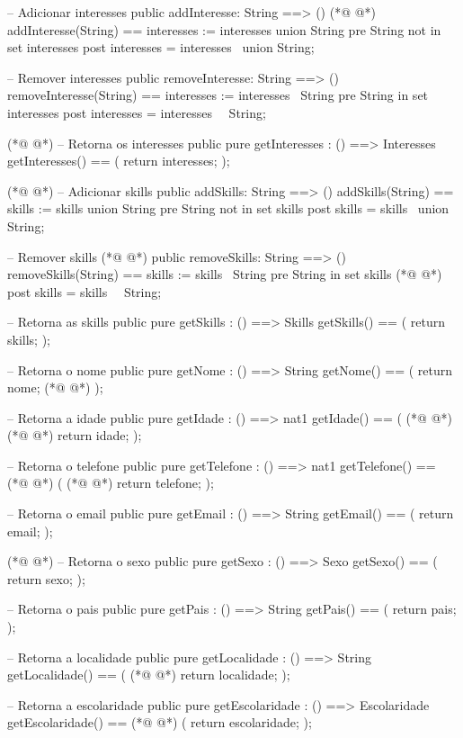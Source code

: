 \begin{vdmpp}[breaklines=true]
 -- Adicionar interesses
 public addInteresse: String ==> ()
(*@
\label{getNome:76}
@*)
 addInteresse(String) == interesses := interesses union {String}
 pre String not in set interesses
 post interesses = interesses~ union {String};
 
 -- Remover interesses
 public removeInteresse: String ==> ()
 removeInteresse(String) == interesses := interesses \ {String}
 pre String in set interesses
 post interesses = interesses~ \ {String};
 
(*@
\label{getIdade:86}
@*)
 -- Retorna os interesses
 public pure getInteresses : () ==> Interesses
 getInteresses() ==
 (
  return interesses;
 );
 
(*@
\label{getTelefone:93}
@*)
 -- Adicionar skills
 public addSkills: String ==> ()
 addSkills(String) == skills := skills union {String}
 pre String not in set skills
 post skills = skills~ union {String};
 
 -- Remover skills
(*@
\label{getSexo:100}
@*)
 public removeSkills: String ==> ()
 removeSkills(String) == skills := skills \ {String}
 pre String in set skills
(*@
\label{getEmail:103}
@*)
 post skills = skills~ \ {String};
 
 -- Retorna as skills
 public pure getSkills : () ==> Skills
 getSkills() ==
 (
  return skills;
 );
 
 -- Retorna o nome
 public pure getNome : () ==> String
 getNome() ==
 (
  return nome;
(*@
\label{setNome:117}
@*)
 );
 
 -- Retorna a idade
 public pure getIdade : () ==> nat1
 getIdade() ==
 (
(*@
\label{setEmail:123}
@*)
(*@
\label{getPais:123}
@*)
  return idade;
 );
 
 -- Retorna o telefone
 public pure getTelefone : () ==> nat1
 getTelefone() ==
(*@
\label{setTelefone:129}
@*)
 (
(*@
\label{getLocalidade:130}
@*)
  return telefone;
 );
 
 -- Retorna o email
 public pure getEmail : () ==> String
 getEmail() ==
 (
  return email;
 );
 
(*@
\label{getEscolaridade:140}
@*)
 -- Retorna o sexo
 public pure getSexo : () ==> Sexo
 getSexo() ==
 (
  return sexo;
 );
 
 -- Retorna o pais
 public pure getPais : () ==> String
 getPais() ==
 (
  return pais;
 );
 
 -- Retorna a localidade
 public pure getLocalidade : () ==> String
 getLocalidade() ==
 (
(*@
\label{setPais:158}
@*)
  return localidade;
 );
 
 -- Retorna a escolaridade
 public pure getEscolaridade : () ==> Escolaridade
 getEscolaridade() ==
(*@
\label{setLocalidade:164}
@*)
 (
  return escolaridade;
 );
 

\end{vdmpp}

